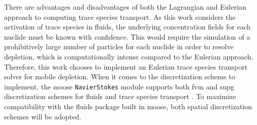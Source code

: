 There are advantages and disadvantages of both the Lagrangian and Eulerian approach to computing trace species transport. As this work considers the activation of trace species in fluids, the underlying concentration fields for each nuclide must be known with confidence. This would require the simulation of a prohibitively large number of particles for each nuclide in order to resolve depletion, which is computationally intense compared to the Eulerian approach. Therefore, this work chooses to implement an Eulerian trace species transport solver for mobile depletion. When it comes to the discretization scheme to implement, the \acrshort{moose} \texttt{NavierStokes} module supports both \acrshort{fvm} and \acrshort{supg} discretization schemes for fluids and trace species transport \cite{moose_ns_summary}. To maximize compatibility with the fluids package built in \acrshort{moose}, both spatial discretization schemes will be adopted.